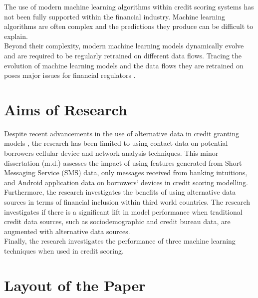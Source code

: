 The use of modern machine learning algorithms within credit scoring systems has not been fully supported within the financial industry. Machine learning algorithms are often complex and the predictions they produce can be difficult to explain. \\

Beyond their complexity, modern machine learning models dynamically evolve and are required to be regularly retrained on different data flows. Tracing the evolution of machine learning models and the data flows they are retrained on poses major issues for financial regulators \parencite{Regulation}. \\


\section{Aims of Research}

Despite recent advancements in the use of alternative data in credit granting models \parencite{BigDataMicroFiance}, the research has been limited to using contact data on potential borrowers cellular device and network analysis techniques. This minor dissertation (m.d.) assesses the impact of using features generated from Short Messaging Service (SMS) data, only messages received from banking intuitions, and Android application data on borrowers` devices in credit scoring modelling. \\

Furthermore, the research investigates the benefits of using alternative data sources in terms of financial inclusion within third world countries. The research investigates if there is a significant lift in model performance when traditional credit data sources, such as sociodemographic and credit bureau data, are augmented with alternative data sources.  \\

Finally, the research investigates the performance of three machine learning techniques when used in credit scoring.  


\section{Layout of the Paper}

